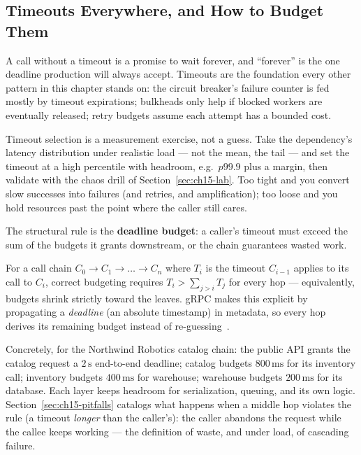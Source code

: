 \subsection{Timeouts Everywhere, and How to Budget Them}
\label{subsec:ch15-timeouts}

A call without a timeout is a promise to wait forever, and ``forever'' is
the one deadline production will always accept. Timeouts are the foundation
every other pattern in this chapter stands on: the circuit breaker's
failure counter is fed mostly by timeout expirations; bulkheads only help
if blocked workers are eventually released; retry budgets assume each
attempt has a bounded cost.

Timeout selection is a measurement exercise, not a guess. Take the
dependency's latency distribution under realistic load --- not the mean,
the tail --- and set the timeout at a high percentile with headroom, e.g.\
$p99.9$ plus a margin, then validate with the chaos drill of
Section~\ref{sec:ch15-lab}. Too tight and you convert slow successes into
failures (and retries, and amplification); too loose and you hold resources
past the point where the caller still cares.

The structural rule is the \textbf{deadline budget}: a caller's timeout
must exceed the sum of the budgets it grants downstream, or the chain
guarantees wasted work.

\begin{definition}
\label{def:ch15-deadline}
For a call chain $C_0 \to C_1 \to \dots \to C_n$ where $T_i$ is the timeout
$C_{i-1}$ applies to its call to $C_i$, correct budgeting requires
$T_i > \sum_{j>i} T_j$ for every hop --- equivalently, budgets shrink
strictly toward the leaves. gRPC makes this explicit by propagating a
\emph{deadline} (an absolute timestamp) in metadata, so every hop derives
its remaining budget instead of re-guessing~\cite{grpcdocs}.
\end{definition}

Concretely, for the Northwind Robotics catalog chain: the public API grants
the catalog request a $2\,\mathrm{s}$ end-to-end deadline; catalog budgets
$800\,\mathrm{ms}$ for its inventory call; inventory budgets
$400\,\mathrm{ms}$ for warehouse; warehouse budgets $200\,\mathrm{ms}$ for
its database. Each layer keeps headroom for serialization, queuing, and its
own logic. Section~\ref{sec:ch15-pitfalls} catalogs what happens when a
middle hop violates the rule (a timeout \emph{longer} than the caller's):
the caller abandons the request while the callee keeps working --- the
definition of waste, and under load, of cascading failure.


